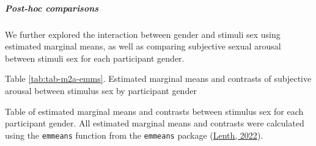 \documentclass[
  bookmarksnumbered]{article}
\begin{document}
\hypertarget{post-hoc-comparisons-1}{%
\subparagraph{\texorpdfstring{\emph{Post-hoc} comparisons}{Post-hoc comparisons}}\label{post-hoc-comparisons-1}}

We further explored the interaction between gender and stimuli sex using estimated marginal means,
as well as comparing subjective sexual arousal between stimuli sex for each participant gender.

Table \ref{tab:tab-m2a-emms}. Estimated marginal means and contrasts of subjective arousal between stimulus sex by participant gender

Table of estimated marginal means and contrasts between stimulus sex for each participant gender. All estimated marginal means and contrasts were calculated using the \texttt{emmeans} function from the \texttt{emmeans} package (\protect\hyperlink{ref-emmeanscit}{Lenth, 2022}).
\end{document}
